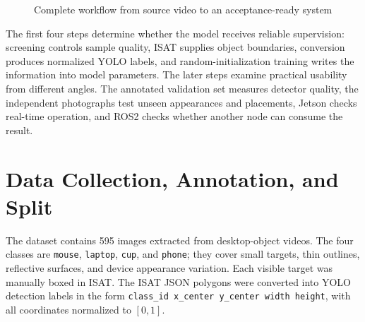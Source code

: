 \documentclass[11pt,conference,a4paper]{IEEEtran}
\newcommand{\code}[1]{\texttt{\footnotesize #1}}
\newcommand{\tightcaption}[1]{\caption{#1}\vspace{-0.4em}}
\begin{document}
\begin{figure}[H]
\centering
{}
\tightcaption{Complete workflow from source video to an acceptance-ready system}
\end{figure}

The first four steps determine whether the model receives reliable supervision: screening controls sample quality, ISAT supplies object boundaries, conversion produces normalized YOLO labels, and random-initialization training writes the information into model parameters. The later steps examine practical usability from different angles. The annotated validation set measures detector quality, the independent photographs test unseen appearances and placements, Jetson checks real-time operation, and ROS2 checks whether another node can consume the result.

\section{Data Collection, Annotation, and Split}
The dataset contains 595 images extracted from desktop-object videos. The four classes are \code{mouse}, \code{laptop}, \code{cup}, and \code{phone}; they cover small targets, thin outlines, reflective surfaces, and device appearance variation. Each visible target was manually boxed in ISAT. The ISAT JSON polygons were converted into YOLO detection labels in the form \code{class\_id x\_center y\_center width height}, with all coordinates normalized to $[0,1]$.
\end{document}
